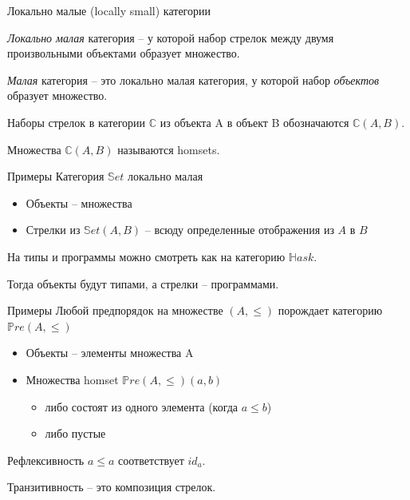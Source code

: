 \documentclass[
  russian,
  aspectratio=169,
  xcolor={svgnames},
  hyperref={colorlinks,citecolor=DeepPink4,linkcolor=DarkRed,urlcolor=DarkBlue}]{beamer}
\begin{document}
\begin{frame}[fragile]{Локально малые (locally small) категории}
\begin{definition}
\emph{Локально малая} категория -- у которой набор стрелок между двумя произвольными объектами образует множество.
\end{definition}
\begin{definition}
\emph{Малая} категория -- это локально малая категория, у которой набор \emph{объектов} образует множество.
\end{definition}
\vspace{1cm}
Наборы стрелок в категории $\mathbb{C}$ из объекта A в объект B обозначаются $\mathbb{C}(A, B)$.

Множества $\mathbb{C}(A, B)$ называются homsets. 
\end{frame}

\begin{frame}[fragile]{Примеры}
Категория $\mathbb{S}et$ локально малая
\begin{itemize}
 \item Объекты -- множества
 \item Стрелки из $\mathbb{S}et(A,B)$ -- всюду определенные отображения из $A$ в $B$
\end{itemize}
\vspace{1cm}

На типы и программы можно смотреть как на категорию $\mathbb{H}ask$. 

Тогда объекты будут типами, а стрелки -- программами.
\end{frame}

\begin{frame}[fragile]{Примеры}
Любой предпорядок на множестве $(A,\leqslant)$ порождает категорию  $\mathbb{P}re(A,\leqslant)$

\begin{itemize}
 \item Объекты -- элементы множества A
 \item Множества homset $\mathbb{P}re(A,\leqslant)(a,b)$ 
    \begin{itemize}
    \item либо состоят из одного элемента (когда $a\leqslant b$)
    \item либо пустые
    \end{itemize}
\end{itemize}
\vspace{1cm}
Рефлексивность $a\leqslant a$ соответствует $id_a$.

Транзитивность -- это композиция стрелок.
\end{frame}
\end{document}
